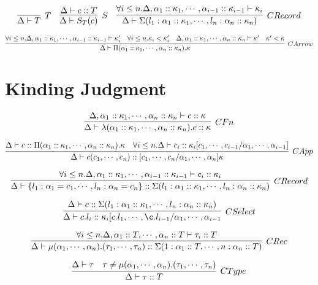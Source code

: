 \documentclass{article}
\begin{document}
$$
\infer[T]{\Delta \vdash T}{}
\quad
\infer[S]{\Delta \vdash \Sing{c}}
{
	\Delta \vdash c :: T
}
\quad
\infer[CRecord]{\Delta \vdash \DRecord{l_1: \alpha_1:: \kappa_1, \cdots, l_n: \alpha_n:: \kappa_n}}
{
	\forall i \leq n . \Delta, \alpha_1:: \kappa_1, \cdots, \alpha_{i-1}:: \kappa_{i-1} \vdash \kappa_i
}
$$

$$
\infer[CArrow]{\Delta \vdash \DArrow{\alpha_1:: \kappa_1, \cdots, \alpha_n:: \kappa_n}{\kappa}}
{
	\forall i \leq n . \Delta, \alpha_1:: \kappa_1, \cdots, \alpha_{i-1}:: \kappa_{i-1} \vdash \kappa'_i
	\quad \forall i \leq n . \kappa_i < \kappa'_i
	\quad \Delta, \alpha_1:: \kappa_1, \cdots, \alpha_n:: \kappa_n \vdash \kappa'
	\quad \kappa' < \kappa
}
$$

\section{Kinding Judgment}

$$
\infer[CFn]{\Delta \vdash \CFn{\alpha_1::\kappa_1,\cdots,\alpha_n::\kappa_n}{c} :: \kappa}
{
	\Delta, \alpha_1::\kappa_1,\cdots,\alpha_n::\kappa_n \vdash c :: \kappa
}
$$

$$
\infer[CApp]{\Delta \vdash \CApp{c}{c_1,\cdots,c_n} :: [c_1,\cdots,c_n/\alpha_1,\cdots,\alpha_n]\kappa}
{
	\Delta \vdash c :: \DArrow{\alpha_1:: \kappa_1, \cdots, \alpha_n:: \kappa_n}{\kappa}
	\quad \forall i \leq n . \Delta \vdash c_i:: \kappa_i[c_1,\cdots,c_{i-1}/\alpha_1,\cdots,\alpha_{i-1}]
}
$$

$$
\infer[CRecord]{\Delta \vdash \CRecord{l_1: \alpha_1 = c_1, \cdots, l_n: \alpha_n = c_n} :: \DRecord{l_1: \alpha_1:: \kappa_1, \cdots, l_n: \alpha_n:: \kappa_n}}
{
	\forall i \leq n . \Delta, \alpha_1:: \kappa_1, \cdots, \alpha_{i-1}:: \kappa_{i-1} \vdash c_i:: \kappa_i
}
$$

$$
\infer[CSelect]{\Delta \vdash \CSelect{c}{l_i} :: \kappa_i[c.l_1,\cdots,\c.l_{i-1}/\alpha_1,\cdots,\alpha_{i-1}}
{
	\Delta \vdash c :: \DRecord{l_1: \alpha_1:: \kappa_1, \cdots, l_n: \alpha_n:: \kappa_n}
}
$$

$$
\infer[CRec]{\Delta \vdash \Rec{\alpha_1,\cdots,\alpha_n}{\tau_1,\cdots,\tau_n} :: \DRecord{1: \alpha_1:: T, \cdots, n: \alpha_n:: T}}
{
	\forall i \leq n . \Delta, \alpha_1::T, \cdots, \alpha_n::T \vdash \tau_i :: T
}
$$



$$
\infer[CType]{\Delta \vdash \tau :: T}
{
	\Delta \vdash \tau
	\quad \tau \neq \Rec{\alpha_1,\cdots,\alpha_n}{\tau_1,\cdots,\tau_n}
}
$$
\end{document}
